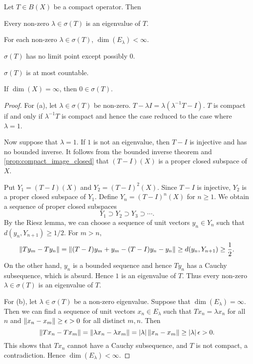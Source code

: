\begin{theorem}
    Let $T\in B(X)$ be a compact operator. Then 
    \begin{thmenum}
        \item Every non-zero $\lambda\in\sigma(T)$ is an eigenvalue 
        of $T$. 
        \item For each non-zero $\lambda\in\sigma(T)$, $\dim(E_\lambda)<\infty$. 
        \item $\sigma(T)$ has no limit point except possibly $0$.
        \item $\sigma(T)$ is at most countable.  
        \item If $\dim(X) = \infty$, then $0\in\sigma(T)$.
    \end{thmenum}
\end{theorem}
\begin{proof}
    For (a), let $\lambda\in\sigma(T)$ be non-zero. $T-\lambda I = \lambda(\lambda^{-1}T - I)$. 
    $T$ is compact if and only if $\lambda^{-1}T$ is compact and 
    hence the case reduced to the case where $\lambda = 1$. 

    Now suppose that $\lambda = 1$. If $1$ is not an eigenvalue, then 
    $T-I$ is injective and has no bounded inverse. It follows from the 
    bounded inverse theorem and \cref{prop:compact_image_closed} that 
    $(T-I)(X)$ is a proper closed subspace of $X$. 

    Put $Y_1 = (T-I)(X)$ and $Y_2 = (T-I)^2(X)$. Since $T-I$ is injective, 
    $Y_2$ is a proper closed subspace of $Y_1$. Define $Y_n = (T-I)^n(X)$ for $n\geq 1$. 
    We obtain a sequence of proper closed subspaces 
    \begin{equation*}
        Y_1\supset Y_2\supset Y_3\supset \cdots.
    \end{equation*}
    By the Riesz lemma, we can choose a sequence of unit vectors 
    $y_n\in Y_n$ such that $d(y_n, Y_{n+1})\geq 1/2$. For $m>n$, 
    \begin{equation*}
        \left\lVert {Ty_m - Ty_n} \right\rVert = \left\lVert {(T-I)y_m + y_m - (T-I)y_n - y_n} \right\rVert 
        \geq d(y_n, Y_{n+1}) \geq \frac{1}{2}.
    \end{equation*}
    On the other hand, $y_n$ is a bounded sequence and hence $Ty_n$ has 
    a Cauchy subsequence, which is absurd. Hence $1$ is an eigenvalue 
    of $T$. Thus every non-zero $\lambda\in\sigma(T)$ is an eigenvalue of $T$. 

    For (b), let $\lambda\in\sigma(T)$ be a non-zero eigenvalue. 
    Suppose that $\dim(E_\lambda) = \infty$. Then we can find a 
    sequence of unit vectors $x_n\in E_\lambda$ such that $Tx_n 
    = \lambda x_n$ for all $n$ and $\left\lVert {x_n - x_m} \right\rVert\geq \epsilon > 0$ 
    for all distinct $m,n$. Then 
    \begin{equation*}
        \left\lVert {Tx_n - Tx_m} \right\rVert = \left\lVert {\lambda x_n - \lambda x_m} \right\rVert 
        = \left\lvert {\lambda} \right\rvert\left\lVert {x_n - x_m} \right\rVert \geq \left\lvert {\lambda} \right\rvert\epsilon > 0.
    \end{equation*}
    This shows that $Tx_n$ cannot have a Cauchy subsequence, 
    and $T$ is not compact, a contradiction. Hence $\dim(E_\lambda)<\infty$.  


\end{proof}
